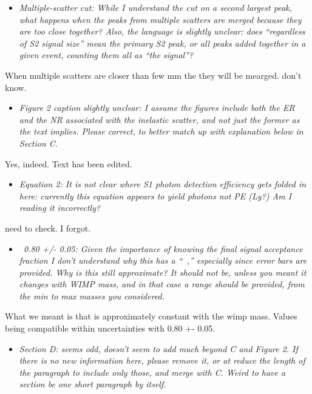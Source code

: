 \documentclass{article}
\begin{document}
\begin{itemize}
	\item \em{
Multiple-scatter cut: While I understand the cut on a second largest
peak, what happens when the peaks from multiple scatters are merged
because they are too close together? Also, the language is slightly
unclear: does “regardless of S2 signal size” mean the primary S2 peak,
or all peaks added together in a given event, counting them all as
“the signal”?}
\end{itemize}

{\color{red} When multiple scatters are closer than few mm the they will be mearged. don't know. } 

\begin{itemize}
	\item \em{
Figure 2 caption slightly unclear: I assume the figures include both
the ER and the NR associated with the inelastic scatter, and not just
the former as the text implies. Please correct, to better match up
with explanation below in Section C.}
\end{itemize}

{\color{red} Yes, indeed. Text has been edited. } 

\begin{itemize}
	\item \em{
Equation 2: It is not clear where S1 photon detection efficiency gets
folded in here: currently this equation appears to yield photons not
PE (Ly?) Am I reading it incorrectly?}
\end{itemize}

{\color{red} need to check. I forgot.}


\begin{itemize}
	\item \em{
~0.80 +/- 0.05: Given the importance of knowing the final signal
acceptance fraction I don’t understand why this has a “~,” especially
since error bars are provided. Why is this still approximate? It
should not be, unless you meant it changes with WIMP mass, and in that
case a range should be provided, from the min to max masses you
considered.}
\end{itemize}

What we meant is that is approximately constant with the wimp mass.
Values being compatible within uncertainties with 0.80 +- 0.05.



\begin{itemize}
	\item \em{
Section D: seems odd, doesn’t seem to add much beyond C and Figure 2.
If there is no new information here, please remove it, or at reduce
the length of the paragraph to include only those, and merge with C.
Weird to have a section be one short paragraph by itself.}
\end{itemize}
\end{document}
